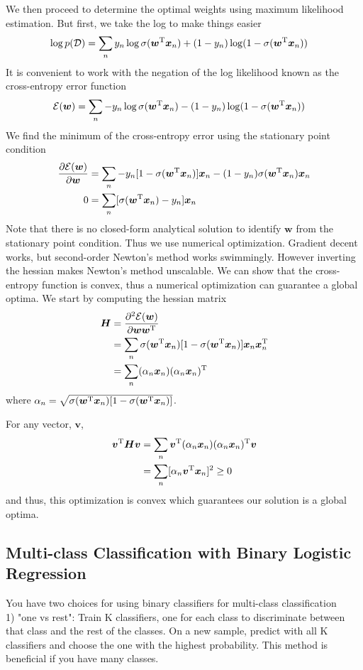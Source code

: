 \documentclass[11pt]{article}
\newcommand{\vct}[1]{\boldsymbol{#1}} %
\newcommand{\mat}[1]{\boldsymbol{#1}} %
\newcommand{\T}{^{\textrm T}} %
\begin{document}
We then proceed to determine the optimal weights using maximum likelihood estimation. But first, we take the log to make things easier
\begin{align*}
\log p(\mathcal{D}) &= \sum_n y_n \log \sigma(\vct{w}\T\vct{x}_n) + (1-y_n) \log (1-\sigma(\vct{w}\T\vct{x}_n))
\end{align*}
It is convenient to work with the negation of the log likelihood known as the cross-entropy error function
\begin{align*}
\mathcal{E}(\vct{w}) &= \sum_n -y_n \log \sigma(\vct{w}\T\vct{x}_n) - (1-y_n) \log (1-\sigma(\vct{w}\T\vct{x}_n))
\end{align*}
We find the minimum of the cross-entropy error using the stationary point condition
\begin{align*}
\frac{\partial \mathcal{E}(\vct{w})}{\partial \vct{w}} &= \sum_n -y_n[1- \sigma(\vct{w}\T\vct{x}_n)]\vct{x}_n - (1-y_n)\sigma(\vct{w}\T\vct{x}_n)\vct{x}_n\\
0 &= \sum_n [\sigma(\vct{w}\T\vct{x}_n) - y_n]\vct{x}_n
\end{align*}
Note that there is no closed-form analytical solution to identify $\vct{w}$ from the stationary point condition. Thus we use numerical optimization. Gradient decent works, but second-order Newton's method works swimmingly. However inverting the hessian makes Newton's method unscalable. We can show that the cross-entropy function is convex, thus a numerical optimization can guarantee a global optima. We start by computing the hessian matrix
\begin{align*}
\mat{H} &= \frac{\partial^2 \mathcal{E}(\vct{w})}{\partial \vct{w}\vct{w}\T}\\
&= \sum_n \sigma(\vct{w}\T\vct{x}_n)[1-\sigma(\vct{w}\T\vct{x}_n)]\vct{x}_n\vct{x}_n\T\\
&= \sum_n (\alpha_n \vct{x}_n)(\alpha_n \vct{x}_n)\T
\end{align*}
where $\alpha_n = \sqrt{\sigma(\vct{w}\T\vct{x}_n)[1-\sigma(\vct{w}\T\vct{x}_n)]}$.

For any vector, $\vct{v}$, 
\begin{align*}
\vct{v}\T\mat{H}\vct{v} &=  \sum_n \vct{v} \T(\alpha_n \vct{x}_n)(\alpha_n \vct{x}_n)\T\vct{v} \\
&= \sum_n [\alpha_n\vct{v}\T\vct{x}_n]^2 \ge 0
\end{align*}
and thus, this optimization is convex which guarantees our solution is a global optima.

\subsection{Multi-class Classification with Binary Logistic Regression}
You have two choices for using binary classifiers for multi-class classification\\
1) "one vs rest": Train K classifiers, one for each class to discriminate between that class and the rest of the classes. On a new sample, predict with all K classifiers and choose the one with the highest probability. This method is beneficial if you have many classes.
\end{document}
